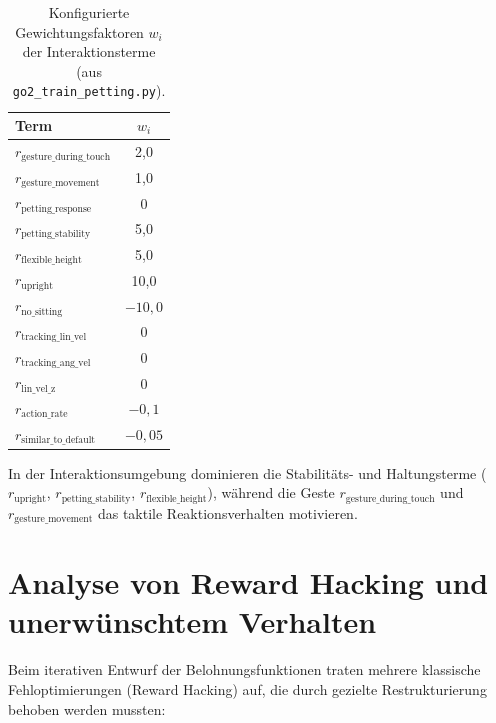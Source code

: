 \begin{table}[htbp]
\centering
\small
\caption{Konfigurierte Gewichtungsfaktoren $w_i$ der Interaktionsterme (aus \texttt{go2\_train\_petting.py}).}
\label{tab:pet_reward_weights}
\begin{tabular}{lc}
\hline
Term & $w_i$ \\
\hline
$r_{\text{gesture\_during\_touch}}$ & 2,0 \\
$r_{\text{gesture\_movement}}$ & 1,0 \\
$r_{\text{petting\_response}}$ & 0 \\
$r_{\text{petting\_stability}}$ & 5,0 \\
$r_{\text{flexible\_height}}$ & 5,0 \\
$r_{\text{upright}}$ & 10,0 \\
$r_{\text{no\_sitting}}$ & $-10{,}0$ \\
$r_{\text{tracking\_lin\_vel}}$ & 0 \\
$r_{\text{tracking\_ang\_vel}}$ & 0 \\
$r_{\text{lin\_vel\_z}}$ & 0 \\
$r_{\text{action\_rate}}$ & $-0{,}1$ \\
$r_{\text{similar\_to\_default}}$ & $-0{,}05$ \\
\hline
\end{tabular}
\end{table}

In der Interaktionsumgebung dominieren die Stabilitäts- und Haltungsterme ($r_{\text{upright}}$, $r_{\text{petting\_stability}}$, $r_{\text{flexible\_height}}$), während die Geste $r_{\text{gesture\_during\_touch}}$ und $r_{\text{gesture\_movement}}$ das taktile Reaktionsverhalten motivieren.

\section{Analyse von Reward Hacking und unerwünschtem Verhalten}

Beim iterativen Entwurf der Belohnungsfunktionen traten mehrere klassische Fehloptimierungen (Reward Hacking) auf, die durch gezielte Restrukturierung behoben werden mussten:

